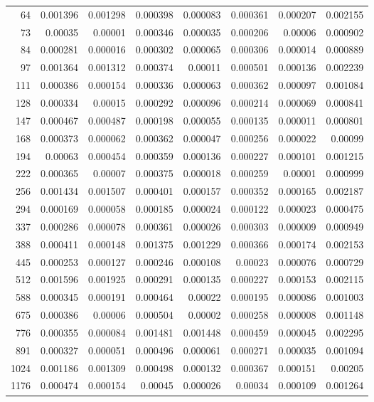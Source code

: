 \begin{longtable}{r r r r r r r r}
64 & 0.001396 & 0.001298 & 0.000398 & 0.000083 & 0.000361 & 0.000207 & 0.002155 \\
73 & 0.00035 & 0.00001 & 0.000346 & 0.000035 & 0.000206 & 0.00006 & 0.000902 \\
84 & 0.000281 & 0.000016 & 0.000302 & 0.000065 & 0.000306 & 0.000014 & 0.000889 \\
97 & 0.001364 & 0.001312 & 0.000374 & 0.00011 & 0.000501 & 0.000136 & 0.002239 \\
111 & 0.000386 & 0.000154 & 0.000336 & 0.000063 & 0.000362 & 0.000097 & 0.001084 \\
128 & 0.000334 & 0.00015 & 0.000292 & 0.000096 & 0.000214 & 0.000069 & 0.000841 \\
147 & 0.000467 & 0.000487 & 0.000198 & 0.000055 & 0.000135 & 0.000011 & 0.000801 \\
168 & 0.000373 & 0.000062 & 0.000362 & 0.000047 & 0.000256 & 0.000022 & 0.00099 \\
194 & 0.00063 & 0.000454 & 0.000359 & 0.000136 & 0.000227 & 0.000101 & 0.001215 \\
222 & 0.000365 & 0.00007 & 0.000375 & 0.000018 & 0.000259 & 0.00001 & 0.000999 \\
256 & 0.001434 & 0.001507 & 0.000401 & 0.000157 & 0.000352 & 0.000165 & 0.002187 \\
294 & 0.000169 & 0.000058 & 0.000185 & 0.000024 & 0.000122 & 0.000023 & 0.000475 \\
337 & 0.000286 & 0.000078 & 0.000361 & 0.000026 & 0.000303 & 0.000009 & 0.000949 \\
388 & 0.000411 & 0.000148 & 0.001375 & 0.001229 & 0.000366 & 0.000174 & 0.002153 \\
445 & 0.000253 & 0.000127 & 0.000246 & 0.000108 & 0.00023 & 0.000076 & 0.000729 \\
512 & 0.001596 & 0.001925 & 0.000291 & 0.000135 & 0.000227 & 0.000153 & 0.002115 \\
588 & 0.000345 & 0.000191 & 0.000464 & 0.00022 & 0.000195 & 0.000086 & 0.001003 \\
675 & 0.000386 & 0.00006 & 0.000504 & 0.00002 & 0.000258 & 0.000008 & 0.001148 \\
776 & 0.000355 & 0.000084 & 0.001481 & 0.001448 & 0.000459 & 0.000045 & 0.002295 \\
891 & 0.000327 & 0.000051 & 0.000496 & 0.000061 & 0.000271 & 0.000035 & 0.001094 \\
1024 & 0.001186 & 0.001309 & 0.000498 & 0.000132 & 0.000367 & 0.000151 & 0.00205 \\
1176 & 0.000474 & 0.000154 & 0.00045 & 0.000026 & 0.00034 & 0.000109 & 0.001264 \\

\end{longtable}
